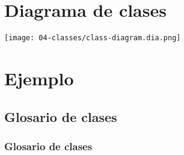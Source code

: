 \section{Diagrama de clases}
\texttt{[image: 04-classes/class-diagram.dia.png]}

\section{Ejemplo}
\subsection{Glosario de clases}
\subsubsection{Glosario de clases}

